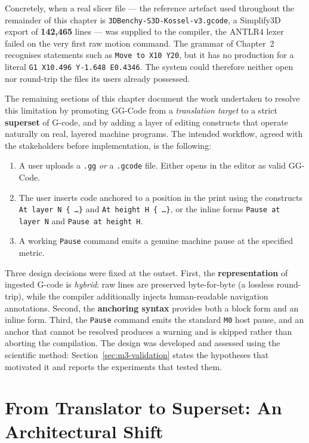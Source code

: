 Concretely, when a real slicer file --- the reference artefact used throughout the remainder of this chapter is \texttt{3DBenchy-S3D-Kossel-v3.gcode}, a Simplify3D export of \textbf{142{,}465} lines --- was supplied to the compiler, the ANTLR4 lexer failed on the very first raw motion command. The grammar of Chapter~2 recognises statements such as \texttt{Move to X10 Y20}, but it has no production for a literal \texttt{G1 X10.496 Y-1.648 E0.4346}. The system could therefore neither open nor round-trip the files its users already possessed.

The remaining sections of this chapter document the work undertaken to resolve this limitation by promoting GG-Code from a \emph{translation target} to a strict \textbf{superset} of G-code, and by adding a layer of editing constructs that operate naturally on real, layered machine programs. The intended workflow, agreed with the stakeholders before implementation, is the following:

\begin{enumerate}
    \item A user uploads a \texttt{.gg} \emph{or} a \texttt{.gcode} file. Either opens in the editor as valid GG-Code.
    \item The user inserts code anchored to a position in the print using the constructs \texttt{At layer N \{ \ldots \}} and \texttt{At height H \{ \ldots \}}, or the inline forms \texttt{Pause at layer N} and \texttt{Pause at height H}.
    \item A working \texttt{Pause} command emits a genuine machine pause at the specified metric.
\end{enumerate}

Three design decisions were fixed at the outset. First, the \textbf{representation} of ingested G-code is \emph{hybrid}: raw lines are preserved byte-for-byte (a lossless round-trip), while the compiler additionally injects human-readable navigation annotations. Second, the \textbf{anchoring syntax} provides both a block form and an inline form. Third, the \texttt{Pause} command emits the standard \texttt{M0} host pause, and an anchor that cannot be resolved produces a warning and is skipped rather than aborting the compilation. The design was developed and assessed using the scientific method: Section~\ref{sec:m3-validation} states the hypotheses that motivated it and reports the experiments that tested them.

\section{From Translator to Superset: An Architectural Shift}

